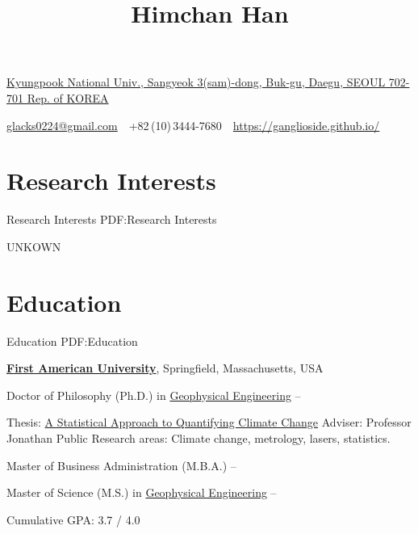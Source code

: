 \documentclass[a4paper,10pt,oneside]{article}
\begin{document}

\title{Himchan Han}

\begin{subtitle}
\href{http://en.knu.ac.kr/}
{Kyungpook National Univ., Sangyeok 3(sam)-dong, Buk-gu, Daegu, SEOUL 702-701 Rep. of KOREA}
\par
\href{mailto: glacks0224@gmail.com}
{glacks0224@gmail.com}
\,\BulletSymbol\,
+82\,(10)\,3444-7680
\,\BulletSymbol\,
\href{https://ganglioside.github.io/}
{https://ganglioside.github.io/}
\end{subtitle}

\begin{body}


\section
{Research Interests}
{Research Interests}
{PDF:Research Interests}

UNKOWN


\section
{Education}
{Education}
{PDF:Education}

\href{http://www.example.com/my-university}
{\textbf{First American University}},
Springfield, Massachusetts, USA

\SmallEntryGap
Doctor of Philosophy (Ph.D.) in
\href{http://www.example.com/my-department}
{Geophysical Engineering}
\hfill
{} --
\begin{detail}
\BulletItem
Thesis:
\href{http://www.example.com/my-phd-thesis}
{A Statistical Approach to Quantifying Climate Change}
\BulletItem
Adviser:
Professor Jonathan Public
\BulletItem
Research areas:
Climate change, metrology, lasers, statistics.
\end{detail}

\SmallEntryGap
Master of Business Administration (M.B.A.)
\hfill
{} --

\SmallEntryGap
Master of Science (M.S.) in
\href{http://www.example.com/my-department}
{Geophysical Engineering}
\hfill
{} --
\begin{detail}
\BulletItem
Cumulative GPA: 3.7 / 4.0
\end{detail}


\end{body}
\end{document}
